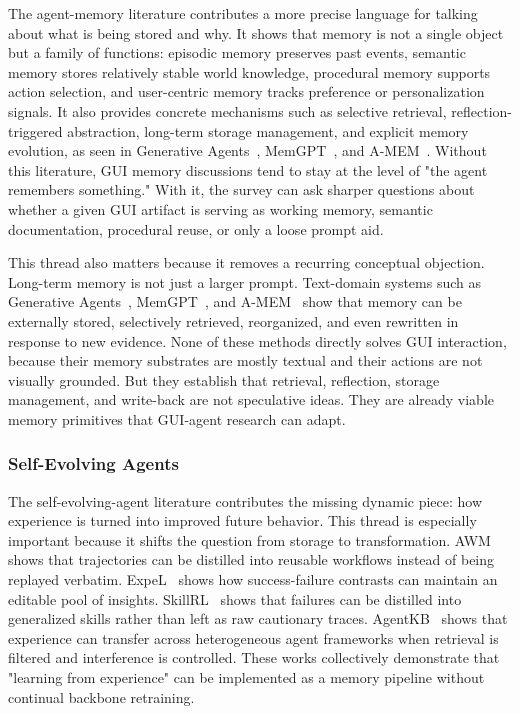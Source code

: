\documentclass{article}
\begin{document}
The agent-memory literature contributes a more precise language for
talking about what is being stored and why. It shows that memory is not
a single object but a family of functions: episodic memory preserves
past events, semantic memory stores relatively stable world knowledge,
procedural memory supports action selection, and user-centric memory
tracks preference or personalization signals. It also provides concrete
mechanisms such as selective retrieval, reflection-triggered
abstraction, long-term storage management, and explicit memory
evolution, as seen in Generative
Agents~\parencite{park2023generativeagents},
MemGPT~\parencite{packer2023memgpt}, and
A-MEM~\parencite{xu2025amem}. Without this
literature, GUI memory discussions tend to stay at the level of "the
agent remembers something." With it, the survey can ask sharper
questions about whether a given GUI artifact is serving as working
memory, semantic documentation, procedural reuse, or only a loose prompt
aid.

This thread also matters because it removes a recurring conceptual
objection. Long-term memory is not just a larger prompt. Text-domain
systems such as Generative
Agents~\parencite{park2023generativeagents},
MemGPT~\parencite{packer2023memgpt}, and
A-MEM~\parencite{xu2025amem} show that memory can be externally stored,
selectively retrieved, reorganized, and even rewritten in response to
new evidence. None of these methods directly solves GUI interaction,
because their memory substrates are mostly textual and their actions
are not visually grounded. But they establish that retrieval,
reflection, storage management, and write-back are not speculative
ideas. They are already viable memory primitives that GUI-agent
research can adapt.

\subsubsection{Self-Evolving
Agents}\label{313-self-evolving-agents}

The self-evolving-agent literature contributes the missing dynamic
piece: how experience is turned into improved future behavior. This
thread is especially important because it shifts the question from
storage to transformation. AWM~\parencite{wang2024awm} shows that
trajectories can be distilled into reusable workflows instead of being
replayed verbatim. ExpeL~\parencite{zhao2024expel} shows how
success-failure contrasts can maintain an editable pool of insights.
SkillRL~\parencite{xia2026skillrl} shows that failures can be distilled
into generalized skills rather than left as raw cautionary traces.
AgentKB~\parencite{tang2025agentkb} shows that experience can transfer
across heterogeneous agent frameworks when retrieval is filtered and
interference is controlled. These works collectively demonstrate that
"learning from experience" can be implemented as a memory pipeline
without continual backbone retraining.
\end{document}
